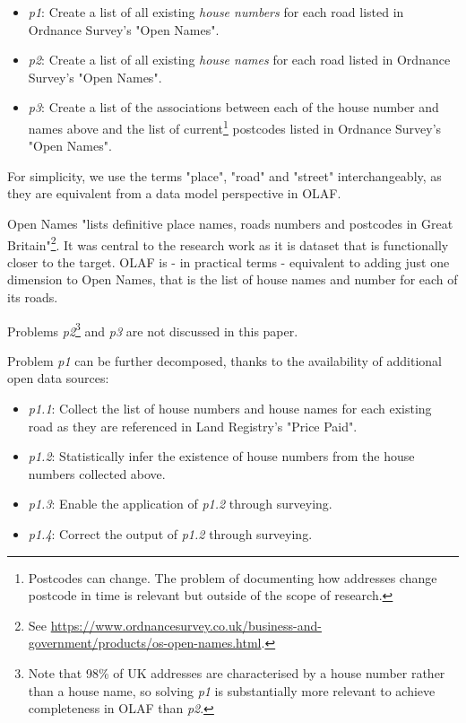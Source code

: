     \begin{itemize}
        \item {\it p1}: Create a list of all existing {\it house numbers} for each road listed in Ordnance Survey's "Open Names".
        \item {\it p2}: Create a list of all existing {\it house names} for each road listed in Ordnance Survey's "Open Names".
        \item {\it p3}: Create a list of the associations between each of the house number and names above and the list of current\footnote{Postcodes can change. The problem of documenting how addresses change postcode in time is relevant but outside of the scope of research.} postcodes listed in Ordnance Survey's "Open Names". 
    \end{itemize}

    For simplicity, we use the terms "place", "road" and "street" interchangeably, as they are equivalent from a data model perspective in OLAF.

    Open Names "lists definitive place names, roads numbers and postcodes in Great Britain"\footnote{See \url{https://www.ordnancesurvey.co.uk/business-and-government/products/os-open-names.html}.}. It was central to the research work as it is dataset that is functionally closer to the target. OLAF is - in practical terms - equivalent to adding just one dimension to Open Names, that is the list of house names and number for each of its roads. 
    
    Problems {\it p2}\footnote{Note that 98\% of UK addresses are characterised by a house number rather than a house name, so solving {\it p1} is substantially more relevant to achieve completeness in OLAF than {\it p2}.} and {\it p3} are not discussed in this paper. 
    
    Problem {\it p1} can be further decomposed, thanks to the availability of additional open data sources:
    
    \begin{itemize}
        \item {\it p1.1}: Collect the list of house numbers and house names for each existing road as they are referenced in Land Registry's "Price Paid".
        \item {\it p1.2}: Statistically infer the existence of house numbers from the house numbers collected above.
        \item {\it p1.3}: Enable the application of {\it p1.2} through surveying.
        \item {\it p1.4}: Correct the output of {\it p1.2} through surveying.
    \end{itemize}

